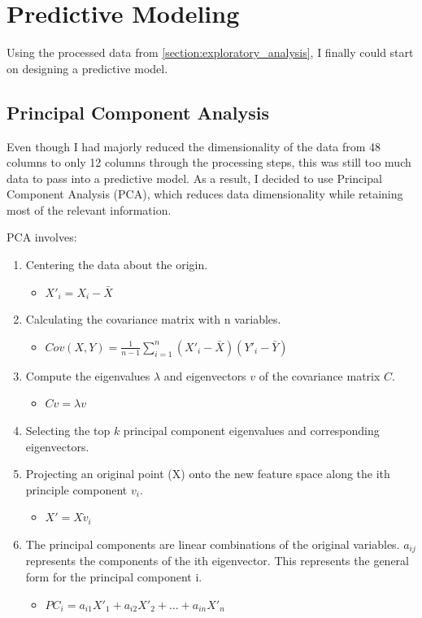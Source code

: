 \section{Predictive Modeling}
\noindent
Using the processed data from \cref{section:exploratory_analysis}, I finally could start on designing a predictive model.

\subsection{Principal Component Analysis}
Even though I had majorly reduced the dimensionality of the data from 48 columns to only 12 columns through the processing steps, this was still too much data to pass into a predictive model. As a result, I decided to use Principal Component Analysis (PCA), which reduces data dimensionality while retaining most of the relevant information.

\noindent
\newline
PCA involves:
\begin{enumerate}
    \item Centering the data about the origin.
    \begin{itemize}
        \item \(X'_i = X_i - \bar{X}\)
    \end{itemize}
    \item Calculating the covariance matrix with n variables.
    \begin{itemize}
        \item \(Cov(X, Y) = \frac{1}{n-1} \sum_{i=1}^{n} \left(X'_i-\bar{X}\right) \left(Y'_i-\bar{Y}\right) \)
    \end{itemize}
    \item Compute the eigenvalues \(\lambda\) and eigenvectors \(v\) of the covariance matrix \(C\).
    \begin{itemize}
        \item \(Cv = \lambda v\)
    \end{itemize}
    \item Selecting the top \(k\) principal component eigenvalues and corresponding eigenvectors.
    \item Projecting an original point (X) onto the new feature space along the ith principle component \(v_i\).
    \begin{itemize}
        \item \(X' = X \dot v_i\)
    \end{itemize}
    \item The principal components are linear combinations of the original variables. \(a_{ij}\) represents the components of the ith eigenvector. This represents the general form for the principal component i.
    \begin{itemize}
        \item \(PC_i = a_{i1} X'_1 + a_{i2} X'_2 + \dots + a_{in} X'_n\)
    \end{itemize}
\end{enumerate}

